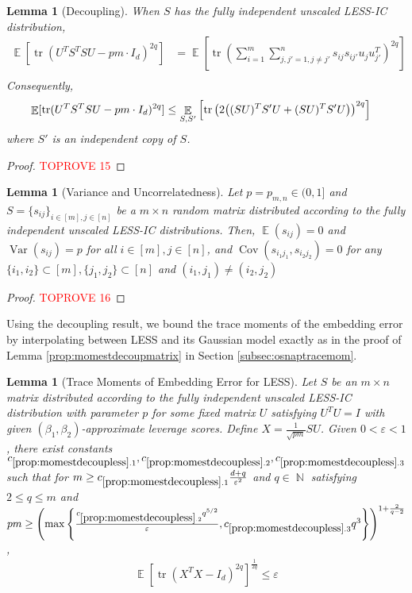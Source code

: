 \documentclass[11pt]{amsart}
\numberwithin{equation}{section}
\numberwithin{equation}{section}
\DeclareMathOperator{\E}{\mathbb{E}}
\DeclareMathOperator{\N}{\mathbb{N}}
\DeclareMathOperator*{\tr}{tr}
\DeclareMathOperator{\cov}{Cov}
\DeclarePairedDelimiter{\paren}{(}{)}
\newtheorem{lemma}[theorem]{Lemma}
\theoremstyle{remark}
\theoremstyle{definition}
\begin{document}
\begin{lemma}[Decoupling] \label{lem:decoupless}
When $S$ has the fully independent unscaled LESS-IC distribution,
\begin{align*}
    \E [ \tr (U^TS^TSU - pm\cdot I_d)^{2q} ] &= \E \left[ \tr \left( \sum_{i=1}^m \sum_{j,j' =1, j \neq j'}^n s_{ij}s_{ij'} u_ju_{j'}^T \right)^{2q} \right] \\
\end{align*}
Consequently,
\begin{align*}
    \E [ \tr (U^TS^TSU - pm\cdot I_d)^{2q} ] &\le \E_{S,S'} \left[ \tr \left(  2\paren*{(SU)^TS'U + (SU)^TS'U} \right)^{2q} \right]
\end{align*}
where $S'$ is an independent copy of $S$.
\end{lemma}
\begin{proof}\textcolor{red}{TOPROVE 15}\end{proof}

\begin{lemma}[Variance and Uncorrelatedness] \label{lem:lessvar}
Let $p = p_{m,n} \in (0,1]$ and $S=\{s_{ij}\}_{i \in [m], j \in [n]}$ be a $m \times n$ random matrix distributed according to the fully independent unscaled LESS-IC distributions. Then, $\E(s_{ij})=0$ and $\operatorname{Var}(s_{ij})=p$ for all $i \in [m], j \in [n]$, and $\cov(s_{i_1 j_1},s_{i_2 j_2})=0$ for any $\{i_1,i_2\} \subset [m], \{j_1,j_2\} \subset [n]$ and $ (i_1,j_1)\neq (i_2,j_2) $
\end{lemma}
\begin{proof}\textcolor{red}{TOPROVE 16}\end{proof}

 Using the decoupling result, we bound the trace moments of the embedding error by interpolating between LESS and its Gaussian model exactly as in the proof of Lemma \ref{prop:momestdecoupmatrix} in Section \ref{subsec:osnaptracemom}.

\begin{lemma} [Trace Moments of Embedding Error for LESS]\label{prop:momestdecoupless}
Let $S$ be an $m \times n$ matrix distributed according to the fully independent unscaled LESS-IC distribution with parameter $p$ for some fixed matrix $U$ satisfying $U^TU=I$ with given $(\beta_1, \beta_2)$-approximate leverage scores. Define $X = \frac{1}{\sqrt{pm}}SU$. Given $0< \varepsilon < 1$, there exist constants $c_{\ref*{prop:momestdecoupless}.1}, c_{\ref*{prop:momestdecoupless}.2}, c_{\ref*{prop:momestdecoupless}.3}$ such that for $m \geq c_{\ref*{prop:momestdecoupless}.1} \frac{d+q}{\varepsilon^2}$ and $q \in \N$ satisfying $2 \le q \le m$ and $ pm \ge \paren*{ \max \left\{ \frac{c_{\ref*{prop:momestdecoupless}.2} q^{5/2}}{\varepsilon}, c_{\ref*{prop:momestdecoupless}.3}  q^3 \right\}}^{1+\frac{2}{q-2}} $ ,
\begin{align*} \E[\tr(X^TX - I_d)^{2q}]^\frac{1}{2q} \leq  \varepsilon \end{align*}
\end{lemma}
\end{document}
